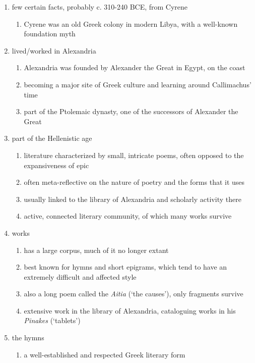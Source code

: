 \documentclass[12pt]{article}
\begin{document}
\begin{enumerate}
\item few certain facts, probably c. 310-240 BCE, from Cyrene
    \begin{enumerate}
    \item Cyrene was an old Greek colony in modern Libya, with a well-known foundation myth
    \end{enumerate}
\item lived/worked in Alexandria
    \begin{enumerate}
    \item Alexandria was founded by Alexander the Great in Egypt, on the coast
    \item becoming a major site of Greek culture and learning around Callimachus' time
    \item part of the Ptolemaic dynasty, one of the successors of Alexander the Great
    \end{enumerate}
\item part of the Hellenistic age
    \begin{enumerate}
    \item literature characterized by small, intricate poems, often opposed to the expansiveness of epic
    \item often meta-reflective on the nature of poetry and the forms that it uses
    \item usually linked to the library of Alexandria and scholarly activity there
    \item active, connected literary community, of which many works survive
    \end{enumerate}
\item works
    \begin{enumerate}
    \item has a large corpus, much of it no longer extant
    \item best known for hymns and short epigrams, which tend to have an extremely difficult and affected style
    \item also a long poem called the \textit{Aitia} (`the causes'), only fragments survive
    \item extensive work in the library of Alexandria, cataloguing works in his \textit{Pinakes} (`tablets')
    \end{enumerate}
\item the hymns
    \begin{enumerate}
    \item a well-established and respected Greek literary form

\end{enumerate}
\end{enumerate}
\end{document}
